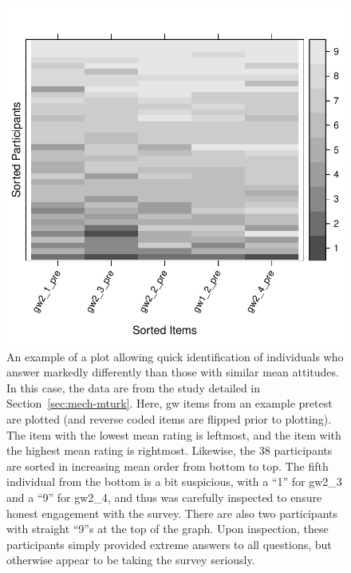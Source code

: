 \begin{figure}
    \begin{center}
        \includegraphics{consistency.pdf}
    \end{center}
    \caption{An example of a plot allowing quick identification of individuals
        who answer markedly differently than those with similar mean attitudes.
        In this case, the data are from the study detailed in
        Section~\ref{sec:mech-mturk}. Here, \textsf{gw} items from an example
        pretest are plotted (and reverse coded items are flipped prior to
        plotting). The item with the lowest mean rating is leftmost, and the
        item with the highest mean rating is rightmost.  Likewise, the 38
        participants are sorted in increasing mean order from bottom to top. The
        fifth individual from the bottom is a bit suspicious, with a “1” for
        \textsf{gw2_3} and a “9” for \textsf{gw2_4}, and thus was carefully
        inspected to ensure honest engagement with the survey. There are also
        two participants with straight “9”s at the top of the graph.  Upon
        inspection, these participants simply provided extreme answers to all
        questions, but otherwise appear to be taking the survey seriously.}
    \label{fig:consistency}
\end{figure}

